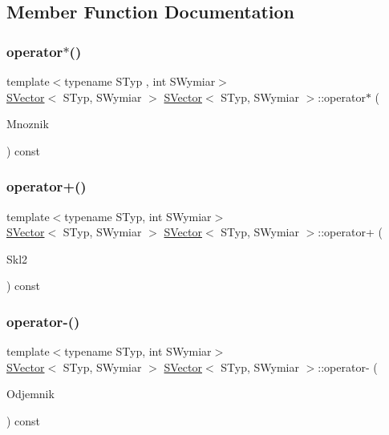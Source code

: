 \subsection{Member Function Documentation}
\mbox{\label{classSVector_a8a915532614341a6365ddb74b1eca496}} 
\subsubsection{\texorpdfstring{operator$\ast$()}{operator*()}}
{\footnotesize\ttfamily template$<$typename S\+Typ , int S\+Wymiar$>$ \\
\hyperlink{classSVector}{S\+Vector}$<$ S\+Typ, S\+Wymiar $>$ \hyperlink{classSVector}{S\+Vector}$<$ S\+Typ, S\+Wymiar $>$\+::operator$\ast$ (\begin{DoxyParamCaption}\item[{double}]{Mnoznik }\end{DoxyParamCaption}) const}

\mbox{\label{classSVector_ab953dcf9cd5c055a6220181472e1c143}} 
\subsubsection{\texorpdfstring{operator+()}{operator+()}}
{\footnotesize\ttfamily template$<$typename S\+Typ, int S\+Wymiar$>$ \\
\hyperlink{classSVector}{S\+Vector}$<$ S\+Typ, S\+Wymiar $>$ \hyperlink{classSVector}{S\+Vector}$<$ S\+Typ, S\+Wymiar $>$\+::operator+ (\begin{DoxyParamCaption}\item[{const \hyperlink{classSVector}{S\+Vector}$<$ S\+Typ, S\+Wymiar $>$ \&}]{Skl2 }\end{DoxyParamCaption}) const}

\mbox{\label{classSVector_a55a33376410034fd14e7534f0544d0ee}} 
\subsubsection{\texorpdfstring{operator-\/()}{operator-()}}
{\footnotesize\ttfamily template$<$typename S\+Typ, int S\+Wymiar$>$ \\
\hyperlink{classSVector}{S\+Vector}$<$ S\+Typ, S\+Wymiar $>$ \hyperlink{classSVector}{S\+Vector}$<$ S\+Typ, S\+Wymiar $>$\+::operator-\/ (\begin{DoxyParamCaption}\item[{const \hyperlink{classSVector}{S\+Vector}$<$ S\+Typ, S\+Wymiar $>$ \&}]{Odjemnik }\end{DoxyParamCaption}) const}

